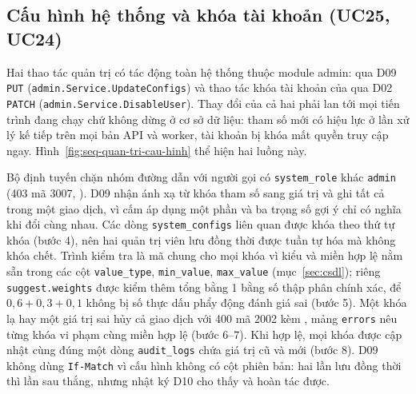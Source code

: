 \subsection{Cấu hình hệ thống và khóa tài khoản (UC25, UC24)}\label{sssec:ht-quan-tri}

Hai thao tác quản trị có tác động toàn hệ thống thuộc module admin:  qua D09 \texttt{PUT}  (\texttt{admin.Service.UpdateConfigs}) và thao tác khóa tài khoản của  qua D02 \texttt{PATCH}  (\texttt{admin.Service.DisableUser}). Thay đổi của cả hai phải lan tới mọi tiến trình đang chạy chứ không dừng ở cơ sở dữ liệu: tham số mới có hiệu lực ở lần xử lý kế tiếp trên mọi bản API và worker, tài khoản bị khóa mất quyền truy cập ngay. Hình~\ref{fig:seq-quan-tri-cau-hinh} thể hiện hai luồng này.


Bộ định tuyến chặn nhóm đường dẫn  với người gọi có \texttt{system\_role} khác \texttt{admin} (403 mã 3007, ). D09 nhận ánh xạ từ khóa tham số sang giá trị và ghi tất cả trong một giao dịch, vì  cấm áp dụng một phần và ba trọng số gợi ý chỉ có nghĩa khi đổi cùng nhau. Các dòng \texttt{system\_configs} liên quan được khóa theo thứ tự khóa (bước 4), nên hai quản trị viên lưu đồng thời được tuần tự hóa mà không khóa chết. Trình kiểm tra là mã chung cho mọi khóa vì kiểu và miền hợp lệ nằm sẵn trong các cột \texttt{value\_type}, \texttt{min\_value}, \texttt{max\_value} (mục~\ref{sec:csdl}); riêng \texttt{suggest.weights} được kiểm thêm tổng bằng 1 bằng số thập phân chính xác, để $0{,}6 + 0{,}3 + 0{,}1$ không bị số thực dấu phẩy động đánh giá sai (bước 5). Một khóa lạ hay một giá trị sai hủy cả giao dịch với 400 mã 2002 kèm , mảng \texttt{errors} nêu từng khóa vi phạm cùng miền hợp lệ (bước 6--7). Khi hợp lệ, mọi khóa được cập nhật cùng đúng một dòng \texttt{audit\_logs} chứa giá trị cũ và mới (bước 8). D09 không dùng \texttt{If-Match} vì cấu hình không có cột phiên bản: hai lần lưu đồng thời thì lần sau thắng, nhưng nhật ký D10 cho thấy và hoàn tác được.

